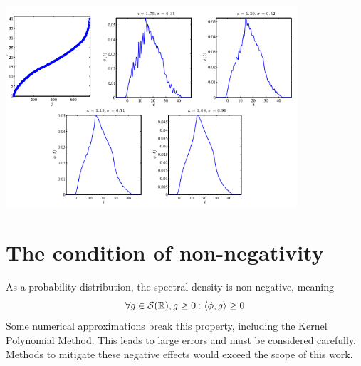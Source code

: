 \includegraphics[height=7.5cm]{./Graphics/screenshot.png}

\section{The condition of non-negativity}
As a probability distribution, the spectral density is non-negative, meaning
\[
\forall g \in \mathcal{S}(\mathbb{R}), g \geq 0: \langle \phi, g \rangle \geq 0
\]
Some numerical approximations break this property, including the Kernel Polynomial Method.
This leads to large errors and must be considered carefully.
Methods to mitigate these negative effects would exceed the scope of this work.